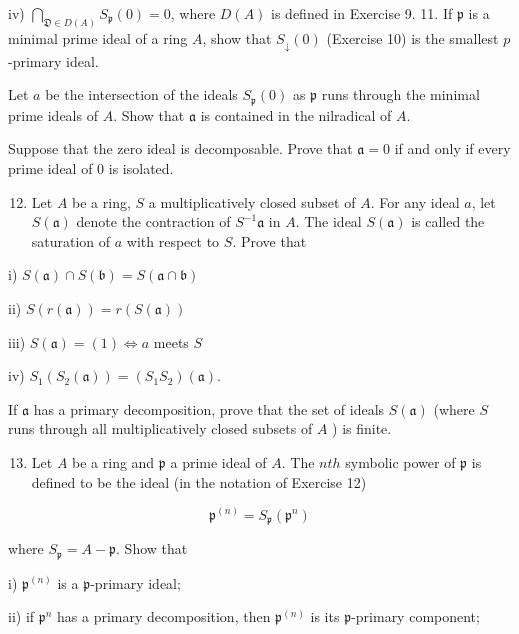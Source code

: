 \documentclass{standalone}
\theoremstyle{definition}
\theoremstyle{remark}
\begin{document}
iv) $\bigcap_{\mathfrak{D} \in D(A)} S_{\mathfrak{p}}(0)=0$, where $D(A)$ is
defined in Exercise 9. 11. If $\mathfrak{p}$ is a minimal prime ideal of a ring
$A$, show that $S_{\mathfrak{\downarrow}}(0)$ (Exercise 10) is the smallest
$p$-primary ideal.

Let $a$ be the intersection of the ideals $S_{\mathfrak{p}}(0)$ as
$\mathfrak{p}$ runs through the minimal prime ideals of $A$. Show that
$\mathfrak{a}$ is contained in the nilradical of $A$.

Suppose that the zero ideal is decomposable. Prove that $\mathfrak{a}=0$ if and
only if every prime ideal of 0 is isolated.

\begin{enumerate}
  \setcounter{enumi}{11}
  \item Let $A$ be a ring, $S$ a multiplicatively closed subset of $A$. For any
  ideal $a$, let $S(\mathfrak{a})$ denote the contraction of $S^{-1}
  \mathfrak{a}$ in $A$. The ideal $S(\mathfrak{a})$ is called the saturation of
  $a$ with respect to $S$. Prove that
\end{enumerate}

i) $S(\mathfrak{a}) \cap S(\mathfrak{b})=S(\mathfrak{a} \cap \mathfrak{b})$

ii) $S(r(\mathfrak{a}))=r(S(\mathfrak{a}))$

iii) $S(\mathfrak{a})=(1) \Leftrightarrow a$ meets $S$

iv) $S_{1}\left(S_{2}(\mathfrak{a})\right)=\left(S_{1}
S_{2}\right)(\mathfrak{a})$.

If $\mathfrak{a}$ has a primary decomposition, prove that the set of ideals
$S(\mathfrak{a})$ (where $S$ runs through all multiplicatively closed subsets of
$A$ ) is finite.

\begin{enumerate}
  \setcounter{enumi}{12}
  \item Let $A$ be a ring and $\mathfrak{p}$ a prime ideal of $A$. The $n t h$
  symbolic power of $\mathfrak{p}$ is defined to be the ideal (in the notation
  of Exercise 12)
\end{enumerate}

\[
\mathfrak{p}^{(n)}=S_{\mathfrak{p}}\left(\mathfrak{p}^{n}\right)
\]

where $S_{\mathfrak{p}}=A-\mathfrak{p}$. Show that

i) $\mathfrak{p}^{(n)}$ is a $\mathfrak{p}$-primary ideal;

ii) if $\mathfrak{p}^{n}$ has a primary decomposition, then $\mathfrak{p}^{(n)}$
is its $\mathfrak{p}$-primary component;
\end{document}
